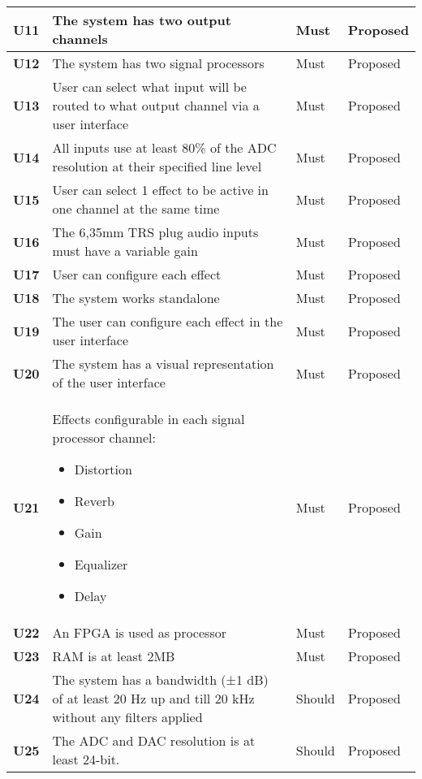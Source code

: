 \begin{longtable}{|l|p{10cm}|l|l|}
	\textbf{U11}&The system has two output channels														 						& Must   & Proposed\\ \hline
	\textbf{U12}&The system has two signal processors														 					& Must   & Proposed\\ \hline
	\textbf{U13}&User can select what input will be routed to what output channel via a user interface							& Must   & Proposed\\ \hline
	\textbf{U14}&All inputs use at least 80\% of the ADC resolution at their specified line level								& Must   & Proposed\\ \hline
	\textbf{U15}&User can select 1 effect to be active in one channel at the same time											& Must   & Proposed\\ \hline
	\textbf{U16}&The 6,35mm TRS plug audio inputs must have a variable gain														& Must   & Proposed\\ \hline
	\textbf{U17}&User can configure each effect															 						& Must   & Proposed\\ \hline
	\textbf{U18}&The system works standalone																					& Must   & Proposed\\ \hline
	\textbf{U19}&The user can configure each effect in the user interface														& Must   & Proposed\\ \hline
	\textbf{U20}&The system has a visual representation of the user interface													& Must   & Proposed\\ \hline
	\textbf{U21}&Effects configurable in each signal processor channel: \newline
	\begin{itemize}
		\setlength\itemsep{-0.4em}
		\item Distortion
		\item Reverb
		\item Gain
		\item Equalizer
		\item Delay
	\end{itemize}																												& Must 	 & Proposed\\ \hline
	\textbf{U22} &An FPGA is used as processor																 					& Must   & Proposed\\ \hline
	\textbf{U23} &RAM is at least 2MB																		 					& Must   & Proposed\\ \hline
	\textbf{U24} &The system has a bandwidth (±1 dB) of at least 20 Hz up and till 20 kHz without any filters applied 			& Should & Proposed\\ \hline
	\textbf{U25} &The ADC and DAC resolution is at least 24-bit.																& Should & Proposed\\ \hline

\end{longtable}
